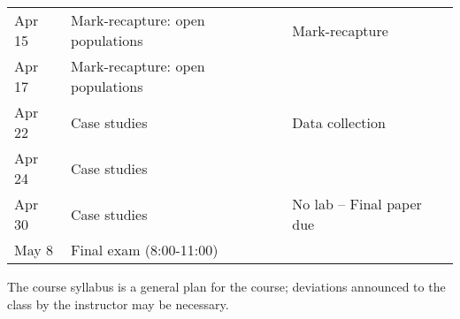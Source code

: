 \documentclass[11pt]{article}
\begin{document}
\begin{center}
\begin{tabular}[c]{lll}
\hline
Apr 15     & Mark-recapture: open populations                & Mark-recapture                    \\
Apr 17     & Mark-recapture: open populations                &                                   \\
\hline
Apr 22     & Case studies                                    & Data collection                   \\
Apr 24     & Case studies                                    &                                   \\
\hline
Apr 30     & Case studies                                    & No lab -- Final paper due         \\
\hline
May  8     & Final exam (8:00-11:00)                         &                                   \\ 
\hline \hline
\end{tabular}
\end{center}

The course syllabus is a general plan for the course; deviations announced to the class by the instructor may be necessary.
\end{document}
